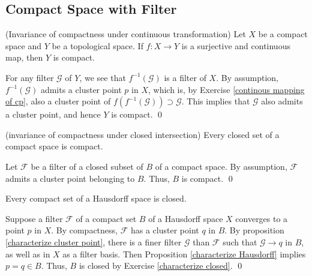 \documentclass{report}
\begin{document}
\subsection{Compact Space with Filter}

\begin{prp}\label{invariance of compactness under ctn} (Invariance of compactness under continuous transformation)
    Let \( X \) be a compact space and \( Y \) be a topological space.
    If \( f:X \to Y \) is a surjective and continuous map, then \( Y \) is compact.
\end{prp}
\begin{prf}
    For any filter \( \mathscr{G} \) of \( Y \), we see that \( f^{-1}(\mathscr{G}) \) is a filter of \( X \). By assumption, \( f^{-1}(\mathscr{G}) \) admits a cluster point \( p \) in \( X \), which is, by Exercise \ref{continous mapping of cp}, also a cluster point of \( f(f^{-1}(\mathscr{G})) \supset \mathscr{G}\). This implies that \( \mathscr{G} \) also admits a cluster point, and hence \( Y \) is compact.
    \qed\end{prf}

\begin{prp}\label{invariance of compactness under closed intersection} (invariance of compactness under closed intersection)
    Every closed set of a compact space is compact.
\end{prp}
\begin{prf}
    Let \( \mathscr{F} \) be a filter of a closed subset of \( B \) of a compact space. By assumption, \( \mathscr{F} \) admits a cluster point belonging to \( B \). Thus, \( B \) is compact.
    \qed\end{prf}

\begin{prp}\label{compact -> closed if Hausdorff}
    Every compact set of a Hausdorff space is closed.
\end{prp}

\begin{prf}
    Suppose a filter \( \mathscr{F} \) of a compact set \( B \) of a Hausdorff space \( X \) converges to a point \( p \) in \( X \). By compactness, \( \mathscr{F} \) has a cluster point \( q \) in \( B \). By proposition \ref{characterize cluster point}, there is a finer filter \( \mathscr{G} \) than \( \mathscr{F} \) such that \( \mathscr{G} \to q \) in \( B \), as well as in \( X \) as a filter basis. Then Proposition \ref{characterize Hausdorff} implies \( p =q \in B \). Thus, \( B \) is closed by Exercise \ref{characterize closed}.
    \qed\end{prf}
\end{document}
